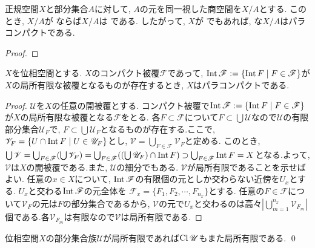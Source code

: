 \documentclass[uplatex, dvipdfmx, a4paper, 12pt, class=jsbook, crop=false]{standalone}
\begin{document}
\begin{proposition}
	正規空間$ X $と部分集合$ A $に対して, $ A $の元を同一視した商空間を$ X / A $とする. このとき, $ X / A $が  ならば$ X / A $は  である. したがって, $ X $が \Lindelof でもあれば, な$ X / A $はパラコンパクトである.
\end{proposition}
\begin{proof}
	\WIP
\end{proof}

\begin{proposition}
	\label{prop:existence of a compact covering whose interior is a locally finite covering>ParaCpt}
	$ X $を位相空間とする. $ X $のコンパクト被覆$\mathscr{F}$であって, $\topint \mathscr{F} \defeq \setcomp{\topint F}{F \in \mathscr{F}}$が$X$の局所有限な被覆となるものが存在するとき, $ X $はパラコンパクトである.
\end{proposition}

\begin{proof}
	$ \mathscr{U} $を$ X $の任意の開被覆とする. コンパクト被覆で$\topint\mathscr{F} \defeq \setcomp{\topint F}{F \in \mathscr{F}}$が$ X $の局所有限な被覆となる$ \mathscr{F} $をとる. 各$ F \subset \mathscr{F} $について$ F \subset \bigcup \mathscr{U} $なので$ \mathscr{U} $の有限部分集合$ \mathscr{U}_F  $で, $ F \subset \bigcup \mathscr{U}_F $となるものが存在する.ここで, $ \mathscr{V}_F = \setcomp{U \cap \topint F}{U \in \mathscr{U}_F}$とし, $ \mathscr{V} = \bigcup_{F \in \mathscr{F}} \mathscr{V}_F $と定める. このとき, $ \bigcup \mathscr{V}=\bigcup_{F\in\mathscr{F}}(\bigcup \mathscr{V}_F) = \bigcup_{F\in \mathscr{F}}((\bigcup \mathscr{U}_F) \cap \mathop{\mathrm{Int}}\nolimits F) \supset \bigcup_{F\in\mathscr{F}}\mathop{\mathrm{Int}}\nolimits F = X $となる.よって, $ \mathscr{V} $は$ X $の開被覆である.また, $ \mathscr{U} $の細分でもある. $ \mathscr{V} $が局所有限であることを示せばよい. 任意の$ x \in X $について, $ \mathop{\mathrm{Int}}\nolimits \mathscr{F} $の有限個の元としか交わらない近傍を$U_x$とする. $ U_x $と交わる$ \mathop{\mathrm{Int}}\nolimits \mathscr{F} $の元全体を
	$ \mathscr{F}_x = \{F_{1}, F_{2} ,\cdots, F_{n_x}\} $とする. 任意の$ F \in \mathscr{F} $について$ \mathscr{V}_F $の元は$ F $の部分集合であるから, $ \mathscr{V} $の元で$ U_x $と交わるのは高々$ |\bigcup_{m=1}^{n_x} \mathscr{V}_{F_m}| $個である.各$ \mathscr{V}_{F_m} $は有限なので$ \mathscr{V} $は局所有限である.
\end{proof}

\begin{lemma}
	\label{lem:every closure of any locally finite family of subsets is locally finite}
	位相空間$ X $の部分集合族$ \mathscr{U} $が局所有限であれば$ \mathop{\mathrm{Cl}}\nolimits \mathscr{U} $もまた局所有限である. \qed
\end{lemma}
\end{document}
